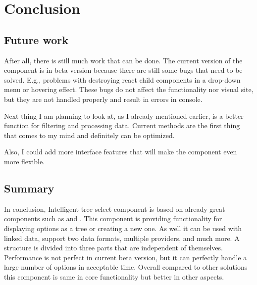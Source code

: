 
\chapter{Conclusion} %

\label{Chapter6} %


\section{Future work}

After all, there is still much work that can be done. The current version of the component is in beta version
because there are still some bugs that need to be solved. E.g., problems with destroying react child components
in a drop-down menu or hovering effect. These bugs do not affect the functionality nor visual site, but they are not handled properly and result in errors in console.

Next thing I am planning to look at, as I already mentioned earlier, is a better function for filtering and processing data. Current methods are the first thing that comes to my mind and definitely can be optimized.

Also, I could add more interface features that will make the component even more flexible. 


\section{Summary}

In conclusion, Intelligent tree select component is based on already great components such as \cite{react-select} and \cite{react-virtualized-select}. This component is providing functionality for displaying options as a tree or creating a new one. As well it can be used with linked data, support two data formats, multiple providers, and much more. A structure is divided into three parts that are independent of themselves. Performance is not perfect in current beta version, but it can perfectly handle a large number of options in acceptable time. Overall compared to other solutions this component is same in core functionality but better in other aspects.

